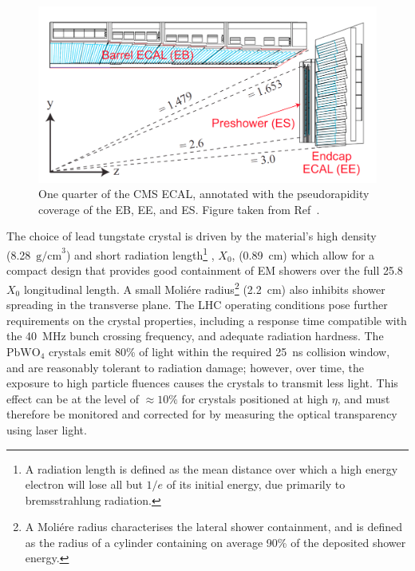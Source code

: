 \begin{figure}[htbp!]
\centering
\includegraphics[width =0.8\linewidth]{Figures/Detector/CMS/ECAL_quadrant.png}\hfill%
\caption[The CMS electromagnetic calorimeter.]{One quarter of the CMS ECAL, annotated with the pseudorapidity coverage of the EB, EE, and ES. Figure taken from Ref~\cite{CMS_ECAL_extra_info}.}
\label{fig:cms_ecal}
\end{figure}

The choice of lead tungstate crystal is driven by the material's high density (8.28~$\mathrm{g/cm}^{3}$) and short radiation length\footnote{A radiation length is defined as the mean distance over which a high energy electron will lose all but $1/e$ of its initial energy, due primarily to bremsstrahlung radiation.}%
, $X_{0}$, (0.89~cm) which allow for a compact design that provides good containment of EM showers over the full 25.8~$X_0$ longitudinal length. A small Moli\'ere radius\footnote{A Moli\'ere radius characterises the lateral shower containment, and is defined as the radius of a cylinder containing on average 90\% of the deposited shower energy.} (2.2~cm) also inhibits shower spreading in the transverse plane. The LHC operating conditions pose further requirements on the crystal properties, including a response time compatible with the 40~MHz bunch crossing frequency, and adequate radiation hardness. The $\mathrm{PbWO}_{4}$ crystals emit 80\% of light within the required 25~ns collision window, and are reasonably tolerant to radiation damage; however, over time, the exposure to high particle fluences causes the crystals to transmit less light. This effect can be at the level of ${\approx}10\%$ for crystals positioned at high $\eta$, and must therefore be monitored and corrected for by measuring the optical transparency using laser light.


